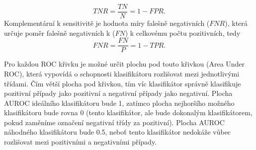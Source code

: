 \begin{equation}
TNR=\frac{TN}{N}=1-FPR.
\end{equation} 
Komplementární k sensitivitě je hodnota míry falešně negativních ($FNR$), která určuje poměr falešně negativních k ($FN$) k celkovému počtu pozitivních, tedy
\begin{equation}
FNR=\frac{FN}{P}=1-TPR.
\end{equation}
\par 
Pro každou ROC křivku je možné určit plochu pod touto křivkou (Area Under ROC), která vypovídá o schopnosti klasifikátoru rozlišovat mezi jednotlivými třídami. Čím větší plocha pod křivkou, tím víc klasifikátor správně klasifikuje pozitivní případy jako pozitivní a negativní případy jako negativní. Plocha AUROC ideálního klasifikátoru bude 1, zatímco plocha nejhoršího možného klasifikátoru bude rovna 0 (tento klasifikátor, ale bude dokonalým klasifikátorem, pokud zaměníme označení negativní třídy za pozitivní). Plocha AUROC náhodného klasifikátoru bude 0.5, neboť tento klasifikátor nedokáže vůbec rozlišovat mezi pozitivními a negativními případy.
